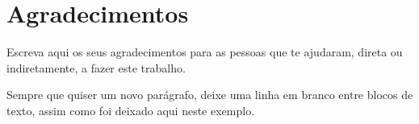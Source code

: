 \chapter*{Agradecimentos}

    Escreva aqui os seus agradecimentos para as pessoas que te ajudaram, direta ou indiretamente, a fazer este trabalho.

    Sempre que quiser um novo parágrafo, deixe uma linha em branco entre blocos de texto, assim como foi deixado aqui neste exemplo.